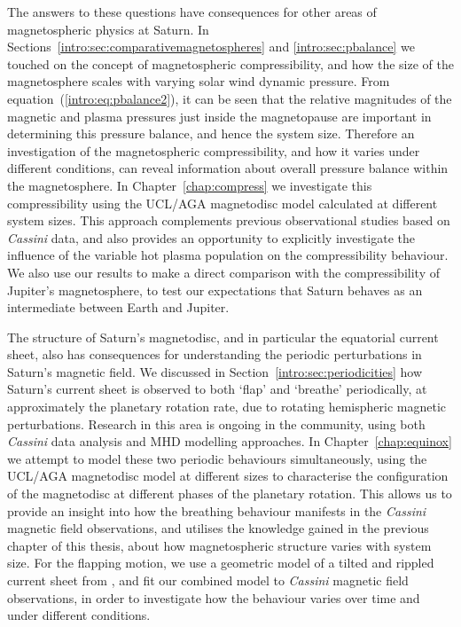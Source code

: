 The answers to these questions have consequences for other areas of magnetospheric physics at Saturn. In Sections~\ref{intro:sec:comparativemagnetospheres} and \ref{intro:sec:pbalance} we touched on the concept of magnetospheric compressibility, and how the size of the magnetosphere scales with varying solar wind dynamic pressure. From equation~(\ref{intro:eq:pbalance2}), it can be seen that the relative magnitudes of the magnetic and plasma pressures just inside the magnetopause are important in determining this pressure balance, and hence the system size. Therefore an investigation of the magnetospheric compressibility, and how it varies under different conditions, can reveal information about overall pressure balance within the magnetosphere. In Chapter~\ref{chap:compress} we investigate this compressibility using the UCL/AGA magnetodisc model calculated at different system sizes. This approach complements previous observational studies based on \textit{Cassini} data, and also provides an opportunity to explicitly investigate the influence of the variable hot plasma population on the compressibility behaviour. We also use our results to make a direct comparison with the compressibility of Jupiter's magnetosphere, to test our expectations that Saturn behaves as an intermediate between Earth and Jupiter.

The structure of Saturn's magnetodisc, and in particular the equatorial current sheet, also has consequences for understanding the periodic perturbations in Saturn's magnetic field. We discussed in Section~\ref{intro:sec:periodicities} how Saturn's current sheet is observed to both `flap' and `breathe' periodically, at approximately the planetary rotation rate, due to rotating hemispheric magnetic perturbations. Research in this area is ongoing in the community, using both \textit{Cassini} data analysis and MHD modelling approaches. In Chapter~\ref{chap:equinox} we attempt to model these two periodic behaviours simultaneously, using the UCL/AGA magnetodisc model at different sizes to characterise the configuration of the magnetodisc at different phases of the planetary rotation. This allows us to provide an insight into how the breathing behaviour manifests in the \textit{Cassini} magnetic field observations, and utilises the knowledge gained in the previous chapter of this thesis, about how magnetospheric structure varies with system size. For the flapping motion, we use a geometric model of a tilted and rippled current sheet from \citet{arridge2011}, and fit our combined model to \textit{Cassini} magnetic field observations, in order to investigate how the behaviour varies over time and under different conditions.

